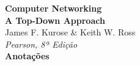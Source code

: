 \documentclass[12pt]{article}
\begin{document}
\begin{titlepage}
    \begin{center}
        {\Huge\bfseries\color{kuroseBlue}Computer Networking}\\
        \vspace{0.4cm}
        {\Large\textbf{\color{kuroseGray}A Top-Down Approach}}\\
        \vspace{0.2cm}
        {\large\color{kuroseBlue}James F. Kurose \& Keith W. Ross}\\
        {\color{kuroseGray}\textit{Pearson, 8ª Edição}}\\
        \vspace{1cm}
        {\large\textbf{Anotações}}\\
        \vfill
    \end{center}
    \tableofcontents
    \thispagestyle{empty}
\end{titlepage}


\end{document}
